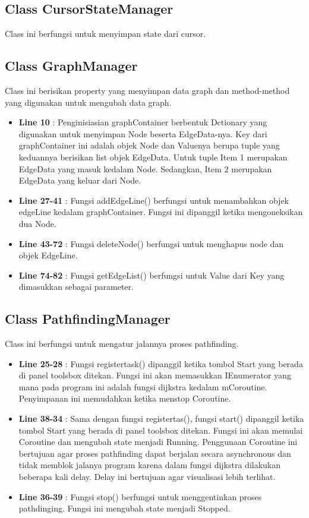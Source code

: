\documentclass[12pt,a4paper,oneside]{article}
\begin{document}
\subsection{Class CursorStateManager}
Class ini berfungsi untuk menyimpan state dari cursor.
\subsection{Class GraphManager}
Class ini berisikan property yang menyimpan data graph dan method-method yang digunakan untuk mengubah data graph.
\begin{itemize}
	\item \textbf{Line 10} : Penginisiasian graphContainer berbentuk Dctionary yang digunakan untuk menyimpan Node beserta EdgeData-nya. Key dari graphContainer ini adalah objek Node dan Valuenya berupa tuple yang keduannya berisikan list objek EdgeData. Untuk tuple Item 1 merupakan EdgeData yang masuk kedalam Node. Sedangkan, Item 2 merupakan EdgeData yang keluar dari Node.
	\item \textbf{Line 27-41} : Fungsi addEdgeLine() berfungsi untuk menambahkan objek edgeLine kedalam graphContainer. Fungsi ini dipanggil ketika mengoneksikan dua Node.
	\item \textbf{Line 43-72} : Fungsi deleteNode() berfungsi untuk menghapus node dan objek EdgeLine.
	\item \textbf{Line 74-82} : Fungsi getEdgeList() berfungsi untuk Value dari Key yang dimasukkan sebagai parameter.   
\end{itemize}
\subsection{Class PathfindingManager}
Class ini berfungsi untuk mengatur jalannya proses pathfinding.
\begin{itemize}
	\item \textbf{Line 25-28} : Fungsi registertask() dipanggil ketika tombol Start yang berada di panel toolsbox ditekan. Fungsi ini akan memasukkan IEnumerator yang mana pada program ini adalah fungsi dijkstra kedalam mCoroutine. Penyimpanan ini memudahkan ketika menstop Coroutine.
	\item \textbf{Line 38-34} : Sama dengan fungsi registertas(), fungsi start() dipanggil ketika tombol Start yang berada di panel toolsbox ditekan. Fungsi ini akan memulai Coroutine dan mengubah state menjadi Running. Penggunaan Coroutine ini bertujuan agar proses pathfinding dapat berjalan secara asynchronous dan tidak memblok jalanya program karena dalam fungsi dijkstra dilakukan beberapa kali delay. Delay ini bertujuan agar visualisasi lebih terlihat.
	\item \textbf{Line 36-39} : Fungsi stop() berfungsi untuk menggentinkan proses pathdinging. Fungsi ini mengubah state menjadi Stopped.
\end{itemize}
\end{document}
